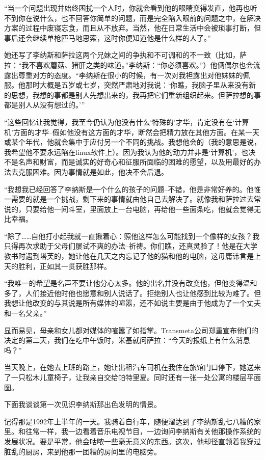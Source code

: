“当一个问题出现并始终困扰一个人时，你就会看到他的眼睛变得发直，他再也听不到你在说什么，也不回答你简单的问题，而是完全陷入眼前的问题之中，在解决方案的过程中废寝忘食，而且从不放弃。当然，他在日常生活中会被琐事打断，但事后还会继续单枪匹马地思索，这时你便知道他是什么样的人了。”

她还写了李纳斯和萨拉这两个兄妹之间的争执和不可调和的不一致（比如，萨拉：“我不喜欢蘑菇、猪肝之类的味道。”李纳斯：“你必须喜欢。”）他俩偶尔也会流露出尊重对方的态度。“李纳斯在很小的时候，有一次对我袒露出对他妹妹的佩服。他那时大概是五岁或七岁，突然严肃地对我说：‘你瞧，我脑子里从来没有新的思想，我想的事都是别人先想出来的，我再把它们重新组织起来。但萨拉想的事都是别人从没有想过的。’”

“这些回忆让我觉得，我至今仍认为他没有什么‘特殊的’才华，肯定没有在‘计算机’方面的才华--假如他没有这方面的才华，断然会把精力放在其他方面。在某一天或某个年代，他就会集中于应付另一个不同的挑战。我想他会的（我的意思是说，我希望他不要永远陷在linux软件上）。因为我认为他的动力并非是‘计算机’，也决不是名声和财富，而是诚实的好奇心和征服所面临的困难的愿望，以及用最好的办法去克服困难。因为事情就是如此，他决不会后退。

“我想我已经回答了李纳斯是一个什么的孩子的问题--不错，他是非常好养的。他惟一需要的就是一个挑战，剩下来的事情就由他自己去解决了。就像我和萨拉过去常说的，只要给他一间斗室，里面放上一台电脑，再给他一些面条吃，他就会觉得无比幸福。

“除了……自他打小起我就一直揪着心：照他这样怎么可能找到一个像样的女孩？我只得再次求助于父母们屡试不爽的办法--祈祷。你们瞧，还真灵验了！他是在大学教书时遇到塔芙的，她让他在几天之内忘记了他的猫和他的电脑，这毋庸讳言是上天的胜利，正如其一贯获胜那样。

“我唯一的希望是名声不要让他分心太多。他的出名并没有改变他，但他变得温和多了，人们接近他时他也愿意和别人说话了。拒绝别人也让他感到比较为难了。但我想让他改变的与其说是所有媒体的喧嚣，还不如说主要是由于他成为了一个丈夫和一名父亲。”

显而易见，母亲和女儿都对媒体的喧嚣了如指掌。Transmeta公司郑重宣布他们的决定的第二天，我们在吃中午饭时，米基就问萨拉：“今天的报纸上有什么消息吗？”

当天晚上，在她去上班的路上，她让出租汽车司机在我住在旅馆门口停下，她送来了一只松木儿童椅子，让我亲自交给帕特里夏。同时还有一张一处公寓的楼层平面图。

 

下面我谈谈第一次见识李纳斯那出色发明的情景。

记得那是1992年上半年的一天。我骑着自行车，随便溜达到了李纳斯乱七八糟的家里。和往常一样，我一边看着音乐电视节目，一边询问李纳斯有关他那操作系统的发展状况。要是平常，他会咕哝一些毫无意义的东西。这次，他却径直领着我穿过脏乱的厨房，来到他那一团糟的房间里的电脑旁。

